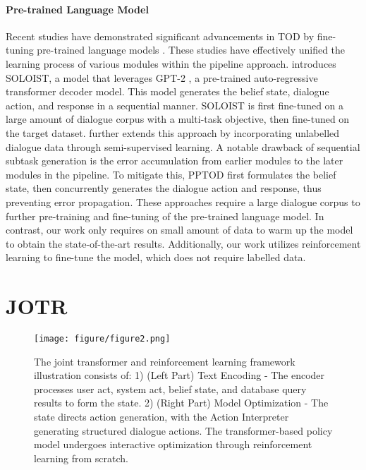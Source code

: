 \documentclass[letterpaper]{article} %
\begin{document}
\paragraph{Pre-trained Language Model}
Recent studies have demonstrated significant advancements in TOD by fine-tuning pre-trained language models \cite{budzianowski-vulic-2019-hello,hosseini-asl_simple_2020,lee-2021-improving-end,su-etal-2022-multi,zhao-etal-2022-unids}. These studies have effectively unified the learning process of various modules within the pipeline approach. \citet{peng-etal-2021-soloist} introduces SOLOIST, a model that leverages GPT-2 \cite{radford2019language}, a pre-trained auto-regressive transformer decoder model. This model generates the belief state, dialogue action, and response in a sequential manner. 
SOLOIST is first fine-tuned on a large amount of dialogue corpus with a multi-task objective, then fine-tuned on the target dataset. \citet{he2022galaxy} further extends this approach by incorporating unlabelled dialogue data through semi-supervised learning. A notable drawback of sequential subtask generation is the error accumulation from earlier modules to the later modules in the pipeline. To mitigate this, PPTOD first formulates the belief state, then concurrently generates the dialogue action and response, thus preventing error propagation.  
These approaches require a large dialogue corpus to further pre-training and fine-tuning of the pre-trained language model. In contrast, our work only requires on small amount of data to warm up the model to obtain the state-of-the-art results. Additionally, our work utilizes reinforcement learning to fine-tune the model, which does not require labelled data. 

\section{JOTR}
\begin{figure*}[htbp]
\setlength{\belowcaptionskip}{-0.4cm}   %
\centering
\texttt{[image: figure/figure2.png]}
\caption{The joint transformer and reinforcement learning framework illustration consists of: 1) (Left Part) Text Encoding - The encoder processes user act, system act, belief state, and database query results to form the state. 2) (Right Part) Model Optimization - The state directs action generation, with the Action Interpreter generating structured dialogue actions. The transformer-based policy model undergoes interactive optimization through reinforcement learning from scratch.}
\label{fig:arch}
\end{figure*}
\end{document}
